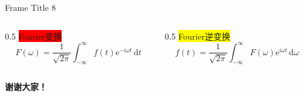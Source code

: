 \documentclass{beamer}
\begin{document}
\begin{frame}{Frame Title 8}
    \begin{columns}
        \begin{column}{0.5\linewidth}
            \colorbox{red}{Fourier变换}
            \[
            F(\omega) = \frac{1}{\sqrt{2\pi}}\int_{-\infty}^{\infty}f(t)\mathrm{e}^{-i\omega t}\,\mathrm{d}t
            \]
        \end{column}
        \begin{column}{0.5\linewidth}
            \colorbox{yellow}{Fourier逆变换}
            \[
            f(t) = \frac{1}{\sqrt{2\pi}}\int_{-\infty}^{\infty}F(\omega)\mathrm{e}^{i\omega t}\,\mathrm{d}\omega
            \]
        \end{column}
    \end{columns}
\end{frame}

\begin{frame}
    \begin{center}
        \Huge\textbf{谢谢大家！}
    \end{center}
\end{frame}
\end{document}
